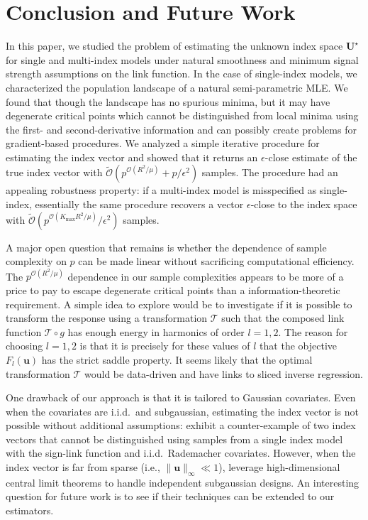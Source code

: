 \documentclass[final,12pt]{colt2018} %
\renewcommand\v[1]{{\ensuremath{\boldsymbol{#1}}}}
\begin{document}
\section{Conclusion and Future Work}
\label{section: conclusion}
In this paper, we studied the problem of estimating the unknown index space $\mathcal{\v U^\star}$ for single and multi-index models under natural smoothness and minimum signal strength assumptions on the link function. In the case of single-index models, we characterized the population landscape of a natural semi-parametric MLE. We found that though the landscape has no spurious minima, but it may have degenerate critical points which cannot be distinguished from local minima using the first- and second-derivative information and can possibly create problems for gradient-based procedures. We analyzed a simple iterative procedure for estimating the index vector and showed that it returns an $\epsilon$-close estimate of the true index vector with $\tilde{\mathcal{O}}(p^{\mathcal{O}(R^2/\mu)} + p/\epsilon^2)$ samples. The procedure had an appealing robustness property: if a multi-index model is misspecified as single-index, essentially the same procedure recovers a vector $\epsilon$-close to the index space with $\tilde{\mathcal{O}}(p^{\mathcal{O}(K_\text{max}R^2/\mu)}/\epsilon^2)$ samples. 

A major open question that remains is whether the dependence of sample complexity on $p$ can be made linear without sacrificing computational efficiency. The $p^{\mathcal{O}(R^2/\mu)}$ dependence in our sample complexities appears to be more of a price to pay to escape degenerate critical points than a information-theoretic requirement. A simple idea to explore would be to investigate if it is possible to transform the response using a transformation $\mathcal{T}$ such that the composed link function $\mathcal{T} \circ g$ has enough energy in harmonics of order $l=1,2$. The reason for choosing $l=1,2$ is that it is precisely for these values of $l$ that the objective $F_l(\v u)$ has the strict saddle property. It seems likely that the optimal transformation $\mathcal{T}$ would be data-driven and have links to sliced inverse regression. 

One drawback of our approach is that it is tailored to Gaussian covariates. Even when the covariates are i.i.d.~and subgaussian, estimating the index vector is not possible without additional assumptions: \citet{ai2014one} exhibit a counter-example of two index vectors that cannot be distinguished using samples from a single index model with the sign-link function and i.i.d.~Rademacher covariates. However, when the index vector is far from sparse (i.e., $\| \v u\|_\infty \ll 1$), \citet{ai2014one} leverage high-dimensional central limit theorems to handle independent subgaussian designs. An interesting question for future work is to see if their techniques can be extended to our estimators. 
\end{document}
